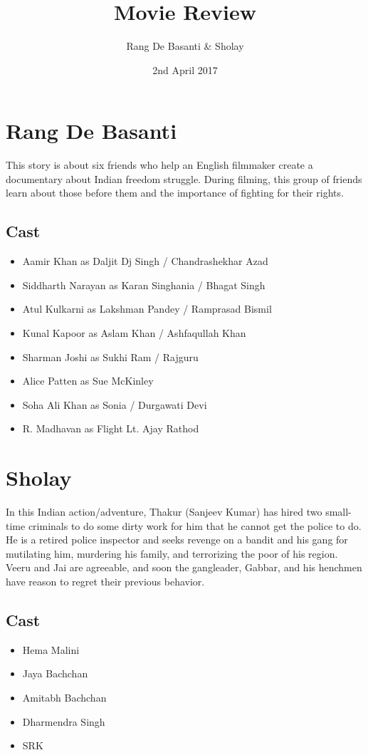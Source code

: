 \documentclass{article}
\title{Movie Review}
\author{Rang De Basanti \& Sholay }
\date{2nd April 2017}
\begin{document}
\maketitle

\section{Rang De Basanti}
This story is about six friends who help an English filmmaker create a documentary about Indian freedom struggle. During filming, this group of friends learn about those before them and the importance of fighting for their rights.
\subsection{Cast}

\begin{itemize}
    \item Aamir Khan as Daljit Dj Singh / Chandrashekhar Azad
    \item Siddharth Narayan as Karan Singhania / Bhagat Singh
    \item Atul Kulkarni as Lakshman Pandey / Ramprasad Bismil
    \item Kunal Kapoor as Aslam Khan / Ashfaqullah Khan
    \item Sharman Joshi as Sukhi Ram / Rajguru
    \item Alice Patten as Sue McKinley
    \item Soha Ali Khan as Sonia / Durgawati Devi
    \item R. Madhavan as Flight Lt. Ajay Rathod
\end{itemize}

\section{Sholay}
In this Indian action/adventure, Thakur (Sanjeev Kumar) has hired two small-time criminals to do some dirty work for him that he cannot get the police to do. He is a retired police inspector and seeks revenge on a bandit and his gang for mutilating him, murdering his family, and terrorizing the poor of his region. Veeru and Jai are agreeable, and soon the gangleader, Gabbar, and his henchmen have reason to regret their previous behavior.
\subsection{Cast}
\begin{itemize}
\item Hema Malini
\item Jaya Bachchan
\item Amitabh Bachchan
\item Dharmendra Singh
\item SRK
  \end{itemize}
\end{document}
